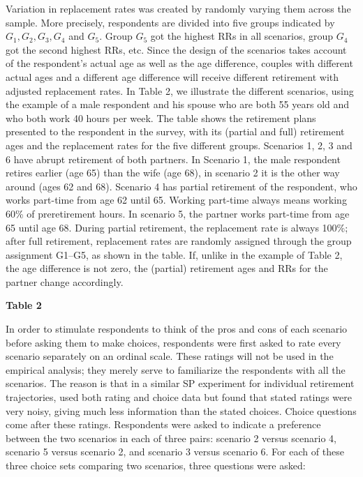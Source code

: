 \documentclass[11pt,letter]{article}
\begin{document}
Variation in replacement rates was created by randomly varying them across the sample. More precisely, respondents are divided into five groups indicated by $G_{1},G_{2},G_{3},G_{4}$ and $G_{5}$. Group $G_{5}$ got the highest RRs in all scenarios, group $G_{4}$ got the second highest RRs, etc. Since the design of the scenarios takes account of the respondent's actual age as well as the age difference, couples with different actual ages and a different age difference will receive different retirement with adjusted replacement rates. In Table 2, we illustrate the different scenarios, using the example of a male respondent and his spouse who are both 55 years old and who both work 40 hours per week. The table shows the retirement plans presented to the respondent in the survey, with its (partial and full) retirement ages and the replacement rates for the five different groups. Scenarios 1, 2, 3 and 6 have abrupt retirement of both partners. In Scenario 1, the male respondent retires earlier (age 65) than the wife (age 68), in scenario 2 it is the other way around (ages 62 and 68). Scenario 4 has partial retirement of the respondent, who works part-time from age 62 until 65. Working part-time always means working 60\% of preretirement hours. In scenario 5, the partner works part-time from age 65 until age 68. During partial retirement, the replacement rate is always 100\%; after full retirement, replacement rates are randomly assigned through the group assignment G1--G5, as shown in the table. If, unlike in the example of Table 2, the age difference is not zero, the (partial) retirement ages and RRs for the partner change accordingly.

\begin{center}
\textbf{Table 2}
\end{center}

\par In order to stimulate respondents to think of the pros and cons of each scenario before asking them to make choices, respondents were first asked to rate every scenario separately on an ordinal scale. These ratings will not be used in the empirical analysis; they merely serve to familiarize the respondents with all the scenarios. The reason is that in a similar SP experiment for individual retirement trajectories, \citet{vsoest2014} used both rating and choice data but found that stated ratings were very noisy, giving much less information than the stated choices. Choice questions come after these ratings. Respondents were asked to indicate a preference between the two scenarios in each of three pairs: scenario 2 versus scenario 4, scenario 5 versus scenario 2, and scenario 3 versus scenario 6. For each of these three choice sets comparing two scenarios, three questions were asked:
\\
\end{document}
